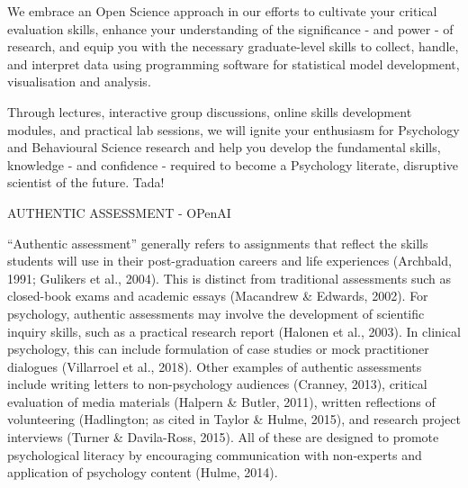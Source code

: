 \documentclass[
  11pt,
  letterpaper,
  oneside,
  open=any]{scrbook}
\begin{document}
\begin{tcolorbox}[enhanced jigsaw, rightrule=.15mm, opacitybacktitle=0.6, colbacktitle=quarto-callout-note-color!10!white, breakable, leftrule=.75mm, bottomtitle=1mm, toptitle=1mm, colback=white, titlerule=0mm, opacityback=0, title=\textcolor{quarto-callout-note-color}{\faInfo}\hspace{0.5em}{Open Stuff}, arc=.35mm, bottomrule=.15mm, toprule=.15mm, left=2mm, coltitle=black]

We embrace an Open Science approach in our efforts to cultivate your
critical evaluation skills, enhance your understanding of the
significance - and power - of research, and equip you with the necessary
graduate-level skills to collect, handle, and interpret data using
programming software for statistical model development, visualisation
and analysis.

\end{tcolorbox}

\begin{tcolorbox}[enhanced jigsaw, rightrule=.15mm, opacitybacktitle=0.6, colbacktitle=quarto-callout-note-color!10!white, breakable, leftrule=.75mm, bottomtitle=1mm, toptitle=1mm, colback=white, titlerule=0mm, opacityback=0, title=\textcolor{quarto-callout-note-color}{\faInfo}\hspace{0.5em}{Teaching and Assessment}, arc=.35mm, bottomrule=.15mm, toprule=.15mm, left=2mm, coltitle=black]

Through lectures, interactive group discussions, online skills
development modules, and practical lab sessions, we will ignite your
enthusiasm for Psychology and Behavioural Science research and help you
develop the fundamental skills, knowledge - and confidence - required to
become a Psychology literate, disruptive scientist of the future. Tada!

\end{tcolorbox}

AUTHENTIC ASSESSMENT - OPenAI

``Authentic assessment'' generally refers to assignments that reflect
the skills students will use in their post-graduation careers and life
experiences (Archbald, 1991; Gulikers et al., 2004). This is distinct
from traditional assessments such as closed-book exams and academic
essays (Macandrew \& Edwards, 2002). For psychology, authentic
assessments may involve the development of scientific inquiry skills,
such as a practical research report (Halonen et al., 2003). In clinical
psychology, this can include formulation of case studies or mock
practitioner dialogues (Villarroel et al., 2018). Other examples of
authentic assessments include writing letters to non-psychology
audiences (Cranney, 2013), critical evaluation of media materials
(Halpern \& Butler, 2011), written reflections of volunteering
(Hadlington; as cited in Taylor \& Hulme, 2015), and research project
interviews (Turner \& Davila-Ross, 2015). All of these are designed to
promote psychological literacy by encouraging communication with
non-experts and application of psychology content (Hulme, 2014).
\end{document}
